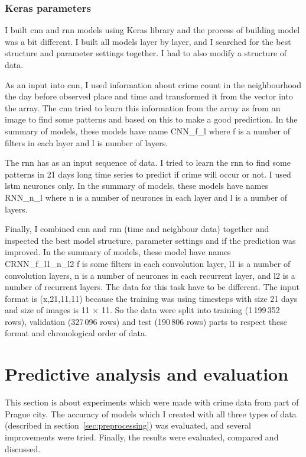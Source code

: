 \documentclass[thesis=M,english]{FITthesis}[2012/10/20]
\begin{document}
\subsubsection{Keras parameters}
I built \gls{cnn} and \gls{rnn} models using Keras library and the process of building model was a bit different. I built all models layer by layer, and I searched for the best structure and parameter settings together. I had to also modify a structure of data. 

As an input into \gls{cnn}, I used information about crime count in the neighbourhood the day before observed place and time and transformed it from the vector into the array. The \gls{cnn} tried to learn this information from the array as from an image to find some patterns and based on this to make a good prediction. In the summary of models, these models have name CNN\_f\_l where f is a number of filters in each layer and l is number of layers.

The \gls{rnn} has as an input sequence of data. I tried to learn the \gls{rnn} to find some patterns in 21 days long time series to predict if crime will occur or not. I used \gls{lstm} neurones only. In the summary of models, these models have names RNN\_n\_l where n is a number of neurones in each layer and l is a number of layers. 

Finally, I combined \gls{cnn} and \gls{rnn} (time and neighbour data) together and inspected the best model structure, parameter settings and if the prediction was improved. In the summary of models, these model have names CRNN\_f\_l1\_n\_l2 f is some filters in each convolution layer, l1 is a number of convolution layers, n is a number of neurones in each recurrent layer, and l2 is a number of recurrent layers. The data for this task have to be different. The input format is (x,21,11,11) because the training was using timesteps with size 21 days and size of images is 11 $\times$ 11. So the data were split into training (1\,199\,352 rows), validation (327\,096 rows) and test (190\,806 rows) parts to respect these format and chronological order of data.

\section{Predictive analysis and evaluation}

This section is about experiments which were made with crime data from part of Prague city. The accuracy of models which I created with all three types of data (described in section~\ref{sec:preprocessing}) was evaluated, and several improvements were tried. Finally, the results were evaluated, compared and discussed.
\end{document}
